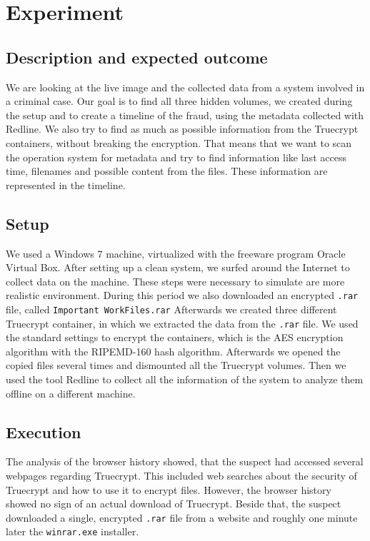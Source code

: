 \section{Experiment}
\subsection{Description and expected outcome}
We are looking at the live image and the collected data from a system involved in a criminal case. Our goal is to find all three hidden volumes, we created during the setup and to create a timeline of the fraud, using the metadata collected with Redline. 
We also try to find as much as possible information from the Truecrypt containers, without breaking the encryption. That means that we want to scan the operation system for metadata and try to find information like last access time, filenames and possible content from the files. These information are represented in the timeline.

\subsection{Setup}
We used a Windows 7 machine, virtualized with the freeware program Oracle Virtual Box. After setting up a clean system, we surfed around the Internet to collect data on the machine. 
These steps were necessary to simulate are more realistic environment.
During this period we also downloaded an encrypted \texttt{.rar} file, called \texttt{Important WorkFiles.rar} Afterwards we created three different Truecrypt container, in which we extracted the data from the \texttt{.rar} file.
We used the standard settings to encrypt the containers, which is the AES encryption algorithm with the RIPEMD-160 hash algorithm.
Afterwards we opened the copied files several times and dismounted all the Truecrypt volumes.
Then we used the tool Redline to collect all the information of the system to analyze them offline on a different machine.

\subsection{Execution}
The analysis of the browser history showed, that the suspect had accessed several webpages regarding Truecrypt. This included web searches about the security of Truecrypt and how to use it to encrypt files. However, the browser history showed no sign of an actual download of Truecrypt. Beside that, the suspect downloaded a single, encrypted \texttt{.rar} file from a website and roughly one minute later the \texttt{winrar.exe} installer.

